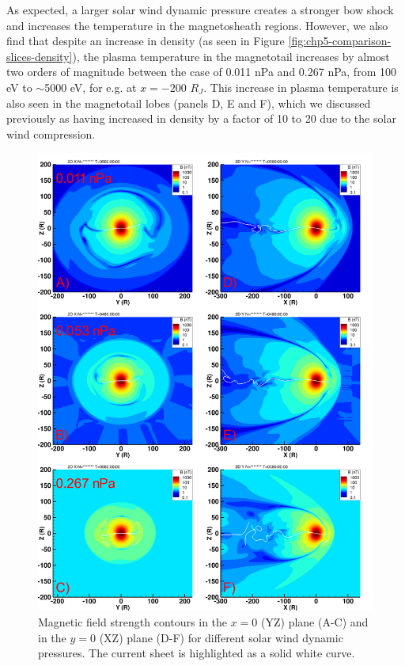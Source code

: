 As expected, a larger solar wind dynamic pressure creates a stronger bow shock and increases the temperature in the magnetosheath regions. However, we also find that despite an increase in density (as seen in Figure \ref{fig:chp5-comparison-slices-density}), the plasma temperature in the magnetotail increases by almost two orders of magnitude between the case of 0.011 nPa and 0.267 nPa, from 100 eV to $\sim$5000 eV, for e.g. at $x=-200$ $R_J$. This increase in plasma temperature is also seen in the magnetotail lobes (panels D, E and F), which we discussed previously as having increased in density by a factor of 10 to 20 due to the solar wind compression. 


\begin{figure}
    \centering
    \includegraphics[height=0.9\textheight]{images5/compare_runs_currentsheet_Bmag.png}
    \caption{Magnetic field strength contours in the $x=0$ (YZ) plane (A-C) and in the $y=0$ (XZ) plane (D-F) for different solar wind dynamic pressures. The current sheet is highlighted as a solid white curve.}
    \label{fig:chp5-comparison-slices-Bmag}
\end{figure}

